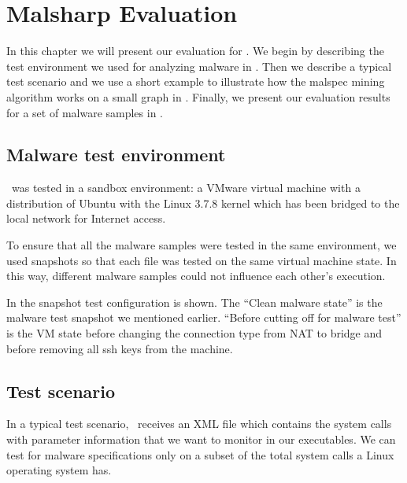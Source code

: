 \chapter{Malsharp Evaluation}
\label{chapter:fifth}

In this chapter we will present our evaluation for \project. We begin by describing the test environment we used for analyzing malware in . Then we describe a typical test scenario and we use a short example to illustrate how the malspec mining algorithm works on a small graph in . Finally, we present our evaluation results for a set of malware samples in .

\section{Malware test environment}
\label{fifth:test-env}

\project\ was tested in a sandbox environment: a VMware virtual machine with a distribution of Ubuntu with the Linux 3.7.8 kernel which has been bridged to the local network for Internet access.

To ensure that all the malware samples were tested in the same environment, we used snapshots so that each file was tested on the same virtual machine state. In this way, different malware samples could not influence each other's execution.


In  the snapshot test configuration is shown. The ``Clean malware state'' is the malware test snapshot we mentioned earlier. ``Before cutting off for malware test'' is the VM state before changing the connection type from NAT to bridge and before removing all ssh keys from the machine.

\section{Test scenario}
\label{fifth:test-scenario}

In a typical test scenario, \project\ receives an XML file which contains the system calls with parameter information that we want to monitor in our executables. We can test for malware specifications only on a subset of the total system calls a Linux operating system has.

